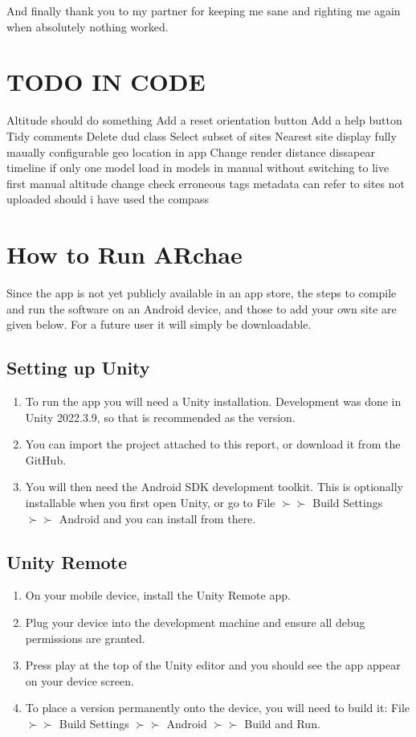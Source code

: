 \documentclass{article}
\begin{document}
And finally thank you to my partner for keeping me sane and righting me again when absolutely nothing worked. 

\section{TODO IN CODE}
Altitude should do something
Add a reset orientation button
Add a help button
Tidy comments
Delete dud class 
Select subset of sites
Nearest site display
fully maually configurable geo location in app
Change render distance
dissapear timeline if only one model
load in models in manual without switching to live first
manual altitude change
check erroneous tags
metadata can refer to sites not uploaded
should i have used the compass 



\appendix

\section{How to Run ARchae}
Since the app is not yet publicly available in an app store, the steps to compile and run the software on an Android device, and those to add your own site are given below. For a future user it will simply be downloadable.

\subsection{Setting up Unity}
\begin{enumerate}
    \item To run the app you will need a Unity installation. Development was done in Unity 2022.3.9, so that is recommended as the version.
    \item You can import the project attached to this report, or download it from the GitHub.
    \item You will then need the Android SDK development toolkit. This is optionally installable when you first open Unity, or go to File $\succ\succ$ Build Settings $\succ\succ$ Android and you can install from there.
\end{enumerate}

\subsection{Unity Remote}
\begin{enumerate}
    \item On your mobile device, install the Unity Remote app.
    \item Plug your device into the development machine and ensure all debug permissions are granted.
    \item Press play at the top of the Unity editor and you should see the app appear on your device screen.
    \item To place a version permanently onto the device, you will need to build it: File $\succ\succ$ Build Settings $\succ\succ$ Android $\succ\succ$ Build and Run.
\end{enumerate}
\end{document}
